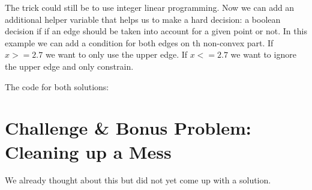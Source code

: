 \documentclass{base}
\begin{document}
The trick could still be to use integer linear programming. Now we can add an additional helper variable that helps us to make a hard decision: a boolean decision if if an edge should be taken into account for a given point or not.
In this example we can add a condition for both edges on th non-convex part. If $x>=2.7$ we want to only use the upper edge. If $x<=2.7$ we want to ignore the upper edge and only constrain.

The code for both solutions:


\clearpage
\section*{Challenge \& Bonus Problem: Cleaning up a Mess}
We already thought about this but did not yet come up with a solution.
\end{document}
